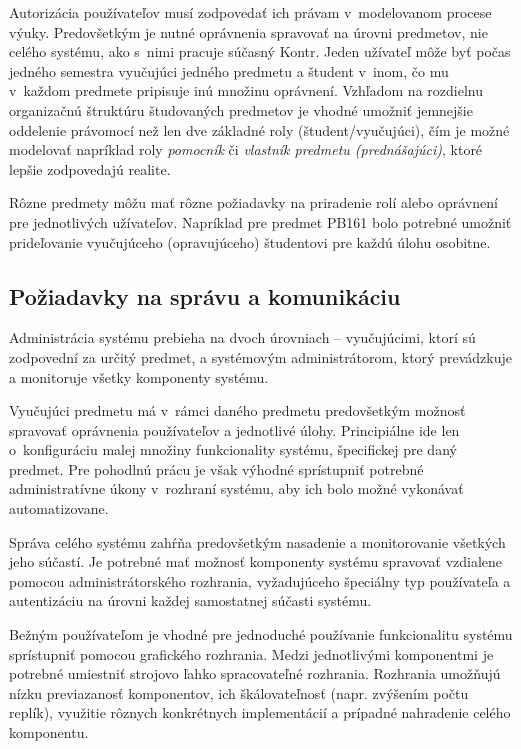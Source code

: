 \documentclass[
  digital, %
  oneside, %
  table,   %
  lof,     %
  lot,   %
]{fithesis3}
\begin{document}
Autorizácia používateľov musí zodpovedať ich právam v~modelovanom procese výuky. Predovšetkým je nutné oprávnenia spravovať na úrovni predmetov, nie celého systému, ako s~nimi pracuje súčasný Kontr. Jeden užívateľ môže byť počas jedného semestra vyučujúci jedného predmetu a študent v~inom, čo mu v~každom predmete pripisuje inú množinu oprávnení. Vzhľadom na rozdielnu organizačnú štruktúru študovaných predmetov je vhodné umožniť jemnejšie oddelenie právomocí než len dve základné roly (študent/vyučujúci), čím je možné modelovať napríklad roly \emph{pomocník} či \emph{vlastník predmetu (prednášajúci)}, ktoré lepšie zodpovedajú realite.

Rôzne predmety môžu mať rôzne požiadavky na priradenie rolí alebo oprávnení pre jednotlivých užívateľov. Napríklad pre predmet PB161 bolo potrebné umožniť prideľovanie vyučujúceho (opravujúceho) študentovi pre každú úlohu osobitne.

\subsection{Požiadavky na správu a komunikáciu}

Administrácia systému prebieha na dvoch úrovniach -- vyučujúcimi, ktorí sú zodpovední za určitý predmet, a systémovým administrátorom, ktorý prevádzkuje a monitoruje všetky komponenty systému. 

Vyučujúci predmetu má v~rámci daného predmetu predovšetkým možnosť spravovať oprávnenia používateľov a jednotlivé úlohy. Principiálne ide len o~konfiguráciu malej množiny funkcionality systému, špecifickej pre daný predmet. Pre pohodlnú prácu je však výhodné sprístupniť potrebné administratívne úkony v~rozhraní systému, aby ich bolo možné vykonávať automatizovane.

Správa celého systému zahŕňa predovšetkým nasadenie a monitorovanie všetkých jeho súčastí. Je potrebné mať možnosť komponenty systému spravovať vzdialene pomocou administrátorského rozhrania, vyžadujúceho špeciálny typ používateľa a autentizáciu na úrovni každej samostatnej súčasti systému.

Bežným používateľom je vhodné pre jednoduché používanie funkcionalitu systému sprístupniť pomocou grafického rozhrania. Medzi jednotlivými komponentmi je potrebné umiestniť strojovo ľahko spracovateľné rozhrania. Rozhrania umožňujú nízku previazanosť komponentov, ich škálovateľnosť (napr. zvýšením počtu replík), využitie rôznych konkrétnych implementácií a prípadné nahradenie celého komponentu.
\end{document}
